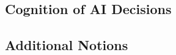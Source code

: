 \subsection{Cognition of AI Decisions} \label{ssec:cognition_ai_decisions}

\subsection{Additional Notions} \label{ssec:additional_notions}













